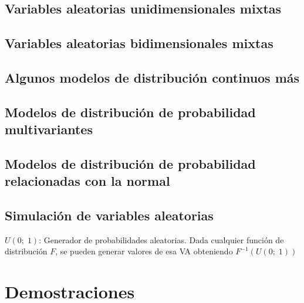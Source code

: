 \documentclass[
]{book}
\begin{document}
\hypertarget{variables-aleatorias-unidimensionales-mixtas}{%
\section{Variables aleatorias unidimensionales mixtas}\label{variables-aleatorias-unidimensionales-mixtas}}

\hypertarget{variables-aleatorias-bidimensionales-mixtas}{%
\section{Variables aleatorias bidimensionales mixtas}\label{variables-aleatorias-bidimensionales-mixtas}}

\hypertarget{algunos-modelos-de-distribuciuxf3n-continuos-muxe1s}{%
\section{Algunos modelos de distribución continuos más}\label{algunos-modelos-de-distribuciuxf3n-continuos-muxe1s}}

\hypertarget{modelos-de-distribuciuxf3n-de-probabilidad-multivariantes}{%
\section{Modelos de distribución de probabilidad multivariantes}\label{modelos-de-distribuciuxf3n-de-probabilidad-multivariantes}}

\hypertarget{modelos-de-distribuciuxf3n-de-probabilidad-relacionadas-con-la-normal}{%
\section{Modelos de distribución de probabilidad relacionadas con la normal}\label{modelos-de-distribuciuxf3n-de-probabilidad-relacionadas-con-la-normal}}

\hypertarget{simulaciuxf3n-de-variables-aleatorias}{%
\section{Simulación de variables aleatorias}\label{simulaciuxf3n-de-variables-aleatorias}}

\(U(0;\; 1)\): Generador de probabilidades aleatorias. Dada cualquier función de distribución \(F\), se pueden generar valores de esa VA obteniendo \(F^{-1}(U(0;\; 1))\)

\hypertarget{demostraciones}{%
\chapter{Demostraciones}\label{demostraciones}}
\end{document}
